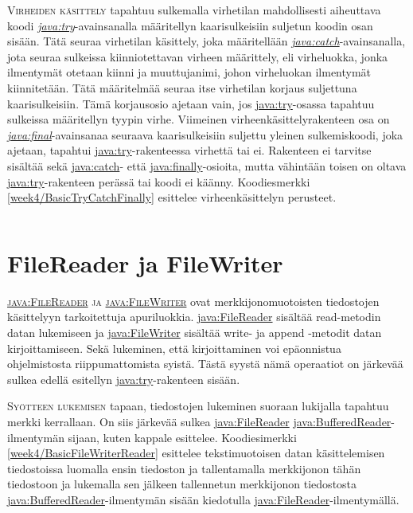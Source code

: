 \documentclass[openany]{book}
\newcommand{\newthought}[1]{\smallskip\textsc{#1}}
\newcommand{\java}[1]{\underline{\gls{java:#1}}}
\newcommand{\newjava}[1]{\textit{\java{#1}}}
\newcommand{\code}[3]{
	\begin{listing}
		\linespread{0.85}
		\inputminted{java}{OhjelmointiopasEsimerkit/src/#1/#2.java}
		\caption{#1: #3}
		\label{#1/#2}
	\end{listing}
}
\begin{document}
\newthought{Virheiden käsittely} tapahtuu sulkemalla virhetilan mahdollisesti aiheuttava koodi
\newjava{try}-avainsanalla määritellyn kaarisulkeisiin suljetun koodin osan sisään. Tätä seuraa
virhetilan käsittely, joka määritellään \newjava{catch}-avainsanalla, jota seuraa sulkeissa
kiinniotettavan virheen määrittely, eli virheluokka, jonka ilmentymät otetaan kiinni ja
muuttujanimi, johon virheluokan ilmentymät kiinnitetään. Tätä määritelmää seuraa itse virhetilan
korjaus suljettuna kaarisulkeisiin. Tämä korjausosio ajetaan vain, jos \java{try}-osassa tapahtuu
sulkeissa määritellyn tyypin virhe. Viimeinen virheenkäsittelyrakenteen osa on
\newjava{final}-avainsanaa seuraava kaarisulkeisiin suljettu yleinen sulkemiskoodi, joka ajetaan,
tapahtui \java{try}-rakenteessa virhettä tai ei. Rakenteen ei tarvitse sisältää sekä \java{catch}-
että \java{finally}-osioita, mutta vähintään toisen on oltava \java{try}-rakenteen perässä tai
koodi ei käänny. Koodiesmerkki \ref{week4/BasicTryCatchFinally} esittelee virheenkäsittelyn
perusteet.

\code{week4}{BasicTryCatchFinally}{\java{try}-, \java{catch}- ja \java{finally}-avainsanojen
käyttäminen}


\section{FileReader ja FileWriter}
\label{tiedostoapureista}

\newthought{\java{FileReader} ja \java{FileWriter}} ovat merkkijonomuotoisten tiedostojen
käsittelyyn tarkoitettuja apuriluokkia. \java{FileReader} sisältää read-metodin datan lukemiseen
ja \java{FileWriter} sisältää write- ja append -metodit datan kirjoittamiseen. Sekä lukeminen,
että kirjoittaminen voi epäonnistua ohjelmistosta riippumattomista syistä. Tästä syystä nämä
operaatiot on järkevää sulkea edellä esitellyn \java{try}-rakenteen sisään. 

\newthought{Syötteen lukemisen} tapaan, tiedostojen lukeminen suoraan lukijalla tapahtuu merkki
kerrallaan. On siis järkevää sulkea \java{FileReader} \java{BufferedReader}-ilmentymän sijaan,
kuten kappale  esittelee. Koodiesimerkki \ref{week4/BasicFileWriterReader}
esittelee tekstimuotoisen datan käsittelemisen tiedostoissa luomalla ensin tiedoston ja
tallentamalla merkkijonon tähän tiedostoon ja lukemalla sen jälkeen tallennetun merkkijonon
tiedostosta \java{BufferedReader}-ilmentymän sisään kiedotulla \java{FileReader}-ilmentymällä.
\end{document}
